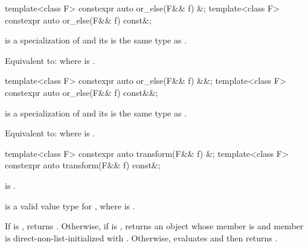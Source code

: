%
\begin{itemdecl}
template<class F> constexpr auto or_else(F&& f) &;
template<class F> constexpr auto or_else(F&& f) const&;
\end{itemdecl}

\begin{itemdescr}
\pnum
\mandates
{} is a specialization of  and its  is the same type as .

\pnum
\effects
Equivalent to:  where  is .
\end{itemdescr}

%
\begin{itemdecl}
template<class F> constexpr auto or_else(F&& f) &&;
template<class F> constexpr auto or_else(F&& f) const&&;
\end{itemdecl}

\begin{itemdescr}
\pnum
\mandates
{} is a specialization of  and its  is the same type as .

\pnum
\effects
Equivalent to:  where  is .
\end{itemdescr}

%
\begin{itemdecl}
template<class F> constexpr auto transform(F&& f) &;
template<class F> constexpr auto transform(F&& f) const&;
\end{itemdecl}

\begin{itemdescr}
\pnum
\constraints
{} is .

\pnum
\mandates
{} is a valid value type for , where  is .

\pnum
\effects
If  is , returns . Otherwise, if  is , returns an  object whose  member is  and  member is direct-non-list-initialized with . Otherwise, evaluates  and then returns .
\end{itemdescr}

